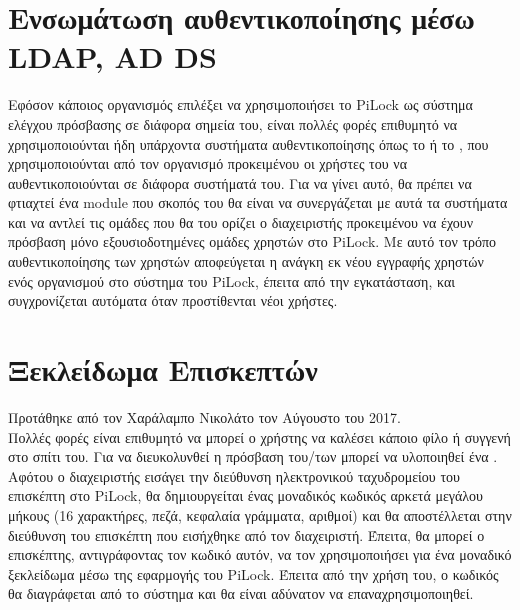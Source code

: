 \section{Ενσωμάτωση αυθεντικοποίησης μέσω LDAP, AD DS}
	Εφόσον κάποιος οργανισμός επιλέξει να χρησιμοποιήσει το PiLock ως σύστημα ελέγχου πρόσβασης σε διάφορα σημεία του, είναι πολλές φορές επιθυμητό να χρησιμοποιούνται ήδη υπάρχοντα συστήματα αυθεντικοποίησης όπως το  ή το , που χρησιμοποιούνται από τον οργανισμό προκειμένου οι χρήστες του να αυθεντικοποιούνται σε διάφορα συστήματά του. Για να γίνει αυτό, θα πρέπει να φτιαχτεί ένα module που σκοπός του θα είναι να συνεργάζεται με αυτά τα συστήματα και να αντλεί τις ομάδες που θα του ορίζει ο διαχειριστής προκειμένου να έχουν πρόσβαση μόνο εξουσιοδοτημένες ομάδες χρηστών στο PiLock. Με αυτό τον τρόπο αυθεντικοποίησης των χρηστών αποφεύγεται η ανάγκη εκ νέου εγγραφής χρηστών ενός οργανισμού στο σύστημα του PiLock, έπειτα από την εγκατάσταση, και συγχρονίζεται αυτόματα όταν προστίθενται νέοι χρήστες.

\section{Ξεκλείδωμα Επισκεπτών}
	Προτάθηκε από τον Χαράλαμπο Νικολάτο τον Αύγουστο του 2017.\\Πολλές φορές είναι επιθυμητό να μπορεί ο χρήστης να καλέσει κάποιο φίλο ή συγγενή στο σπίτι του. Για να διευκολυνθεί η πρόσβαση του/των μπορεί να υλοποιηθεί ένα . Αφότου ο διαχειριστής εισάγει την διεύθυνση ηλεκτρονικού ταχυδρομείου του επισκέπτη στο PiLock, θα δημιουργείται ένας μοναδικός κωδικός αρκετά μεγάλου μήκους (16 χαρακτήρες, πεζά, κεφαλαία γράμματα, αριθμοί) και θα αποστέλλεται στην διεύθυνση του επισκέπτη που εισήχθηκε από τον διαχειριστή. Έπειτα, θα μπορεί ο επισκέπτης, αντιγράφοντας τον κωδικό αυτόν, να τον χρησιμοποιήσει για ένα μοναδικό ξεκλείδωμα μέσω της εφαρμογής του PiLock. Έπειτα από την χρήση του, ο κωδικός θα διαγράφεται από το σύστημα και θα είναι αδύνατον να επαναχρησιμοποιηθεί.
